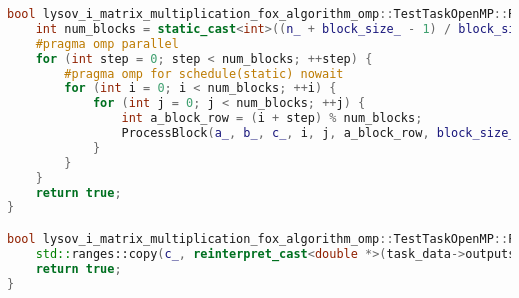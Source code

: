 \documentclass[12pt,a4paper]{extarticle}
\begin{document}
\begin{lstlisting}[language=C++]
bool lysov_i_matrix_multiplication_fox_algorithm_omp::TestTaskOpenMP::RunImpl() {
	int num_blocks = static_cast<int>((n_ + block_size_ - 1) / block_size_);
	#pragma omp parallel
	for (int step = 0; step < num_blocks; ++step) {
		#pragma omp for schedule(static) nowait
		for (int i = 0; i < num_blocks; ++i) {
			for (int j = 0; j < num_blocks; ++j) {
				int a_block_row = (i + step) % num_blocks;
				ProcessBlock(a_, b_, c_, i, j, a_block_row, block_size_, n_);
			}
		}
	}
	return true;
}

bool lysov_i_matrix_multiplication_fox_algorithm_omp::TestTaskOpenMP::PostProcessingImpl() {
	std::ranges::copy(c_, reinterpret_cast<double *>(task_data->outputs[0]));
	return true;
}

\end{lstlisting}

\clearpage
{}
\end{document}
